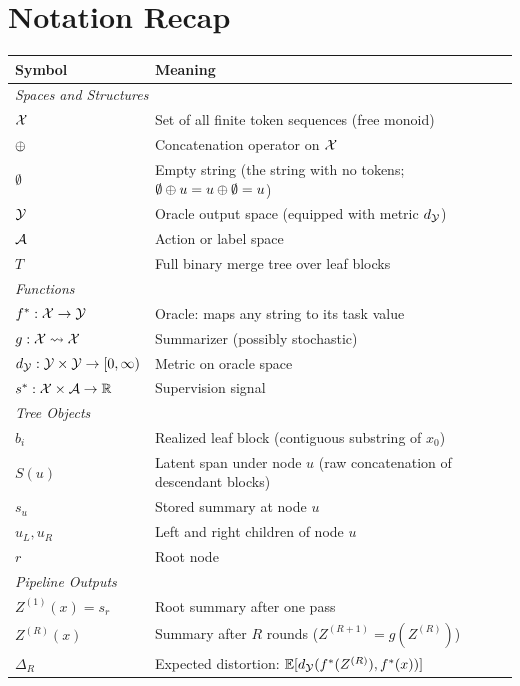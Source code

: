 \section{Notation Recap}\label{app:notation}

\begin{table}[h]
\centering\small
\begin{tabular}{ll}
\toprule
Symbol & Meaning \\
\midrule
\multicolumn{2}{l}{\textit{Spaces and Structures}} \\
$\mathcal{X}$ & Set of all finite token sequences (free monoid) \\
$\oplus$ & Concatenation operator on $\mathcal{X}$ \\
$\emptyset$ & Empty string (the string with no tokens; $\emptyset \oplus u = u \oplus \emptyset = u$) \\
$\mathcal{Y}$ & Oracle output space (equipped with metric $d_{\mathcal{Y}}$) \\
$\mathcal{A}$ & Action or label space \\
$T$ & Full binary merge tree over leaf blocks \\
\midrule
\multicolumn{2}{l}{\textit{Functions}} \\
$f^\ast: \mathcal{X} \to \mathcal{Y}$ & Oracle: maps any string to its task value \\
$g: \mathcal{X} \rightsquigarrow \mathcal{X}$ & Summarizer (possibly stochastic) \\
$d_{\mathcal{Y}}: \mathcal{Y} \times \mathcal{Y} \to [0,\infty)$ & Metric on oracle space \\
$s^\ast: \mathcal{X} \times \mathcal{A} \to \mathbb{R}$ & Supervision signal \\
\midrule
\multicolumn{2}{l}{\textit{Tree Objects}} \\
$b_i$ & Realized leaf block (contiguous substring of $x_0$) \\
$S(u)$ & Latent span under node $u$ (raw concatenation of descendant blocks) \\
$s_u$ & Stored summary at node $u$ \\
$u_L, u_R$ & Left and right children of node $u$ \\
$r$ & Root node \\
\midrule
\multicolumn{2}{l}{\textit{Pipeline Outputs}} \\
$Z^{(1)}(x) = s_r$ & Root summary after one pass \\
$Z^{(R)}(x)$ & Summary after $R$ rounds ($Z^{(R+1)} = g(Z^{(R)})$) \\
$\Delta_R$ & Expected distortion: $\mathbb{E}[d_{\mathcal{Y}}(f^\ast(Z^{(R)}), f^\ast(x))]$ \\

\end{tabular}
\end{table}
